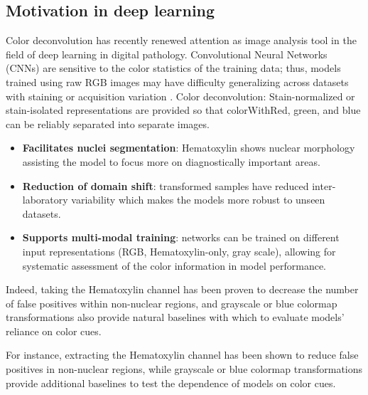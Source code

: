 \documentclass[target=bach,aauheader=,style=]{thud}
\begin{document}
\subsection{Motivation in deep learning}
Color deconvolution has recently renewed attention as image analysis tool in the field of deep learning in digital pathology.
Convolutional Neural Networks (CNNs) are sensitive to the color statistics of the training data; thus, models trained using raw RGB images may have difficulty generalizing across datasets with staining or acquisition variation \cite{ciompi2017importance, tellez2020quantifying, vahadane2016structure}.
Color deconvolution: Stain-normalized or stain-isolated representations are provided so that colorWithRed, green, and blue can be reliably separated into separate images.
\begin{itemize}
\item \textbf{Facilitates nuclei segmentation}: Hematoxylin shows nuclear morphology assisting the model to focus more on diagnostically important areas.
\item \textbf{Reduction of domain shift}: transformed samples have reduced inter-laboratory variability which makes the models more robust to unseen datasets.
\item \textbf{Supports multi-modal training}: networks can be trained on different input representations (RGB, Hematoxylin-only, gray scale), allowing for systematic assessment of the color information in model performance.
\end{itemize}
 
Indeed, taking the Hematoxylin channel has been proven to decrease the number of false positives within non-nuclear regions, and grayscale or blue colormap transformations also provide natural baselines with which to evaluate models’ reliance on color cues.
 
For instance, extracting the Hematoxylin channel has been shown to reduce false positives in non-nuclear regions, while grayscale or blue colormap transformations provide additional baselines to test the dependence of models on color cues.  
\end{document}
